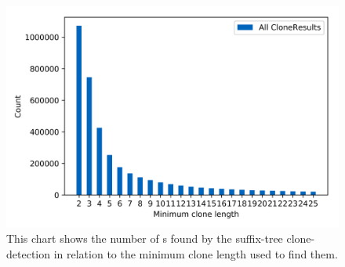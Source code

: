 
\begin{figure}
	\centering
	\includegraphics[width=0.8\linewidth]{figures/Thresholds/raw.png}
	\caption[All found Cloneclasses in relation to the minimum clone length]{This chart shows the number of s found by the suffix-tree clone-detection in relation to the minimum clone length used to find them.}
	\label{fig:thresholdsAll}
\end{figure}
